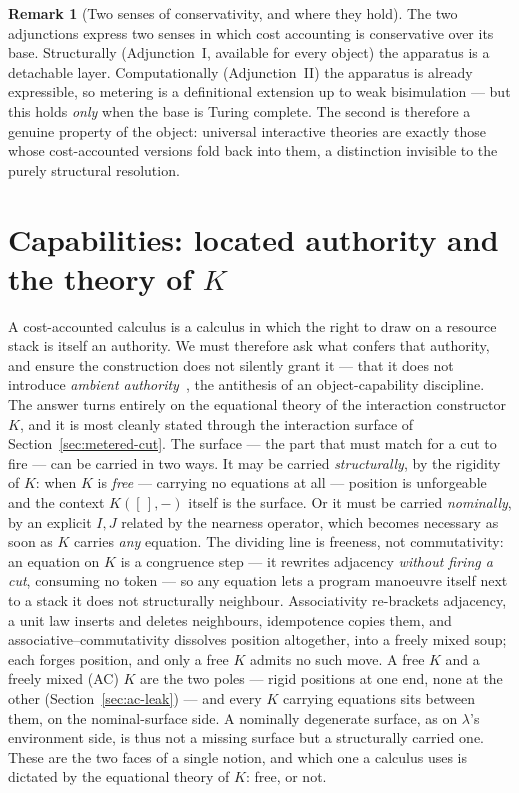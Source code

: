 \documentclass[11pt]{article}
\theoremstyle{definition}
\newtheorem{remark}[definition]{Remark}
\theoremstyle{plain}
\begin{document}
\begin{remark}[Two senses of conservativity, and where they hold]
The two adjunctions express two senses in which cost accounting is
conservative over its base. Structurally (Adjunction~I, available for
every object) the apparatus is a detachable layer. Computationally
(Adjunction~II) the apparatus is already expressible, so metering is a
definitional extension up to weak bisimulation --- but this holds
\emph{only} when the base is Turing complete. The second is therefore a
genuine property of the object: universal interactive theories are
exactly those whose cost-accounted versions fold back into them, a
distinction invisible to the purely structural resolution.
\end{remark}

\section{Capabilities: located authority and the theory of \texorpdfstring{$K$}{K}}
\label{sec:capabilities}

A cost-accounted calculus is a calculus in which the right to draw on a
resource stack is itself an authority. We must therefore ask what confers
that authority, and ensure the construction does not silently grant it ---
that it does not introduce \emph{ambient
authority}~\cite{MillerYeeShapiro2003,Miller2006}, the antithesis of an
object-capability discipline. The answer turns entirely on the equational
theory of the interaction constructor $K$, and it is most cleanly stated
through the interaction surface of Section~\ref{sec:metered-cut}. The
surface --- the part that must match for a cut to fire --- can be carried
in two ways. It may be carried \emph{structurally}, by the rigidity of
$K$: when $K$ is \emph{free} --- carrying no equations at all --- position
is unforgeable and the context $K([\,],-)$ itself is the surface. Or it
must be carried \emph{nominally}, by an explicit $I, J$ related by the
nearness operator, which becomes necessary as soon as $K$ carries
\emph{any} equation. The dividing line is freeness, not commutativity: an
equation on $K$ is a congruence step --- it rewrites adjacency
\emph{without firing a cut}, consuming no token --- so any equation lets a
program manoeuvre itself next to a stack it does not structurally
neighbour. Associativity re-brackets adjacency, a unit law inserts and
deletes neighbours, idempotence copies them, and
associative--commutativity dissolves position altogether, into a freely
mixed soup; each forges position, and only a free $K$ admits no such move.
A free $K$ and a freely mixed (AC) $K$ are the two poles --- rigid
positions at one end, none at the other (Section~\ref{sec:ac-leak}) ---
and every $K$ carrying equations sits between them, on the nominal-surface
side. A nominally degenerate
surface, as on $\lambda$'s environment side, is thus not a missing surface
but a structurally carried one. These are the two faces of a single
notion, and which one a calculus uses is dictated by the equational theory
of $K$: free, or not.
\end{document}

